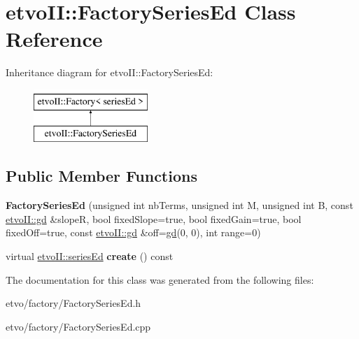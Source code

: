 \hypertarget{classetvo_i_i_1_1_factory_series_ed}{}\section{etvo\+II\+:\+:Factory\+Series\+Ed Class Reference}
\label{classetvo_i_i_1_1_factory_series_ed}
Inheritance diagram for etvo\+II\+:\+:Factory\+Series\+Ed\+:\begin{figure}[H]
\begin{center}
\leavevmode
\includegraphics[height=2.000000cm]{classetvo_i_i_1_1_factory_series_ed}
\end{center}
\end{figure}
\subsection*{Public Member Functions}
\begin{DoxyCompactItemize}
\item 
\mbox{\label{classetvo_i_i_1_1_factory_series_ed_a7802f76e038a023e3ee9d8be4c9a82b4}} 
{\bfseries Factory\+Series\+Ed} (unsigned int nb\+Terms, unsigned int M, unsigned int B, const \mbox{\hyperlink{classetvo_i_i_1_1gd}{etvo\+I\+I\+::gd}} \&slopeR, bool fixed\+Slope=true, bool fixed\+Gain=true, bool fixed\+Off=true, const \mbox{\hyperlink{classetvo_i_i_1_1gd}{etvo\+I\+I\+::gd}} \&off=\mbox{\hyperlink{classetvo_i_i_1_1gd}{gd}}(0, 0), int range=0)
\item 
\mbox{\label{classetvo_i_i_1_1_factory_series_ed_a45f550b195a9b7dfe9b408e5716ef718}} 
virtual \mbox{\hyperlink{classetvo_i_i_1_1series_ed}{etvo\+I\+I\+::series\+Ed}} {\bfseries create} () const
\end{DoxyCompactItemize}


The documentation for this class was generated from the following files\+:\begin{DoxyCompactItemize}
\item 
etvo/factory/Factory\+Series\+Ed.\+h\item 
etvo/factory/Factory\+Series\+Ed.\+cpp\end{DoxyCompactItemize}
